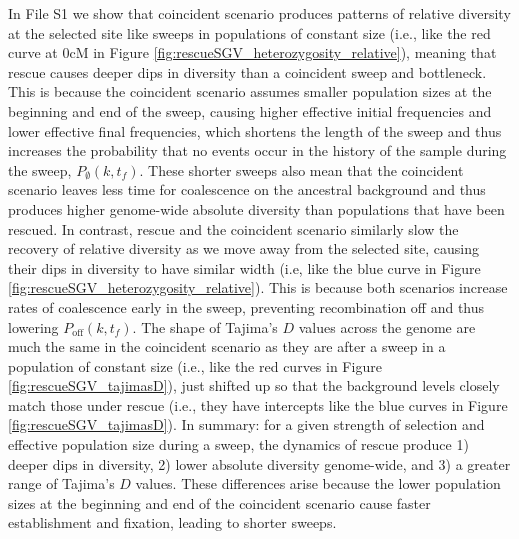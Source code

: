\documentclass[]{article}
\begin{document}
In File S1 we show that coincident scenario produces patterns of relative diversity at the selected site like sweeps in populations of constant size (i.e., like the red curve at 0cM in Figure \ref{fig:rescueSGV_heterozygosity_relative}), meaning that rescue causes deeper dips in diversity than a coincident sweep and bottleneck.
This is because the coincident scenario assumes smaller population sizes at the beginning and end of the sweep, causing higher effective initial frequencies and lower effective final frequencies, which shortens the length of the sweep and thus increases the probability that no events occur in the history of the sample during the sweep, $P_\emptyset(k,t_f)$.
These shorter sweeps also mean that the coincident scenario leaves less time for coalescence on the ancestral background and thus produces higher genome-wide absolute diversity than populations that have been rescued.
In contrast, rescue and the coincident scenario similarly slow the recovery of relative diversity as we move away from the selected site, causing their dips in diversity to have similar width (i.e, like the blue curve in Figure \ref{fig:rescueSGV_heterozygosity_relative}).
This is because both scenarios increase rates of coalescence early in the sweep, preventing recombination off and thus lowering $P_\mathrm{off}(k,t_f)$.
The shape of Tajima's $D$ values across the genome are much the same in the coincident scenario as they are after a sweep in a population of constant size (i.e., like the red curves in Figure \ref{fig:rescueSGV_tajimasD}), just shifted up so that the background levels closely match those under rescue (i.e., they have intercepts like the blue curves in Figure \ref{fig:rescueSGV_tajimasD}).
In summary: for a given strength of selection and effective population size during a sweep, the dynamics of rescue produce 1) deeper dips in diversity, 2) lower absolute diversity genome-wide, and 3) a greater range of Tajima's $D$ values.
These differences arise because the lower population sizes at the beginning and end of the coincident scenario cause faster establishment and fixation, leading to shorter sweeps.
\end{document}
